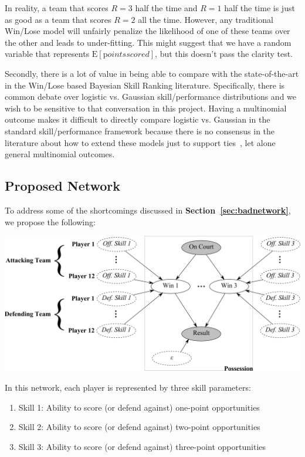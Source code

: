 \documentclass[10pt,twocolumn]{article}
\newcommand{\Elin}[1]{\ensuremath{     \mathrm{E}\left[ #1 \right]   }}
\begin{document}
In reality, a team that scores $R=3$ half the time and $R=1$ half the time is just as good as a team that scores $R=2$ all the time.
However, any traditional Win/Lose model will unfairly penalize the likelihood of one of these teams over the other and leads to under-fitting.
This might suggest that we have a random variable that represents $\Elin{\mathrm points scored}$, but this doesn't pass the clarity test.



Secondly, there is a lot of value in being able to compare with the state-of-the-art in the Win/Lose based Bayesian Skill Ranking literature.
Specifically, there is common debate over logistic vs. Gaussian skill/performance distributions and we wish to be sensitive to that conversation in this project.
Having a multinomial outcome makes it difficult to directly compare logistic vs. Gaussian in the standard skill/performance framework because there is no consensus in the literature about how to extend these models just to support ties~\cite{hunter2004mm}, let alone general multinomial outcomes.

\subsection{Proposed Network}

To address some of the shortcomings discussed in {\bf Section~\ref{sec:badnetwork}}, we propose the following:
\begin{center}
	\includegraphics[width=1.05\linewidth]{figures/newnetwork}
\end{center}

In this network, each player is represented by three skill parameters:
\begin{enumerate}
\item Skill 1: Ability to score (or defend against) one-point opportunities
\item Skill 2: Ability to score (or defend against) two-point opportunities
\item Skill 3: Ability to score (or defend against) three-point opportunities
\end{enumerate}
\end{document}
